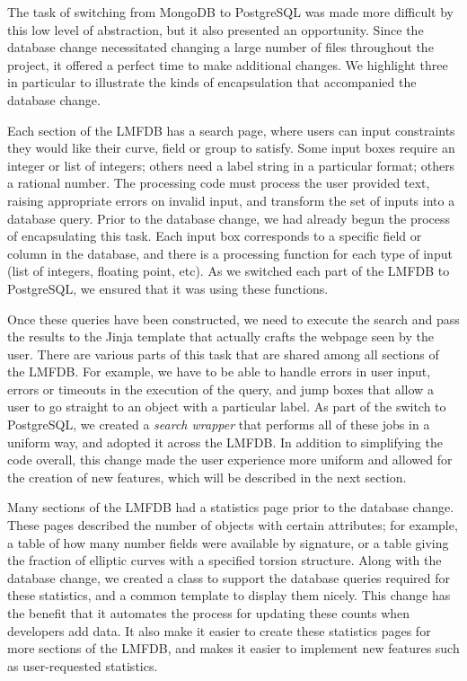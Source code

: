 \documentclass{article}
\begin{document}
The task of switching from MongoDB to PostgreSQL was made more difficult by this low level of abstraction, but it also presented an opportunity.
Since the database change necessitated changing a large number of files throughout the project, it offered a perfect time to make additional changes.
We highlight three in particular to illustrate the kinds of encapsulation that accompanied the database change.

Each section of the LMFDB has a search page, where users can input constraints they would like their curve, field or group to satisfy.
Some input boxes require an integer or list of integers; others need a label string in a particular format; others a rational number.
The processing code must process the user provided text, raising appropriate errors on invalid input, and transform the set of inputs into a database query.
Prior to the database change, we had already begun the process of encapsulating this task.
Each input box corresponds to a specific field or column in the database, and there is a processing function for each type of input (list of integers, floating point, etc).
As we switched each part of the LMFDB to PostgreSQL, we ensured that it was using these functions.

Once these queries have been constructed, we need to execute the search and pass the results to the Jinja template that actually crafts the webpage seen by the user.
There are various parts of this task that are shared among all sections of the LMFDB.
For example, we have to be able to handle errors in user input, errors or timeouts in the execution of the query, and jump boxes that allow a user to go straight to an object with a particular label.
As part of the switch to PostgreSQL, we created a \emph{search wrapper} that performs all of these jobs in a uniform way, and adopted it across the LMFDB.
In addition to simplifying the code overall, this change made the user experience more uniform and allowed for the creation of new features, which will be described in the next section.

Many sections of the LMFDB had a statistics page prior to the database change.
These pages described the number of objects with certain attributes; for example, a table of how many number fields were available by signature, or a table giving the fraction of elliptic curves with a specified torsion structure.
Along with the database change, we created a class to support the database queries required for these statistics, and a common template to display them nicely.
This change has the benefit that it automates the process for updating these counts when developers add data.
It also make it easier to create these statistics pages for more sections of the LMFDB, and makes it easier to implement new features such as user-requested statistics.
\end{document}
